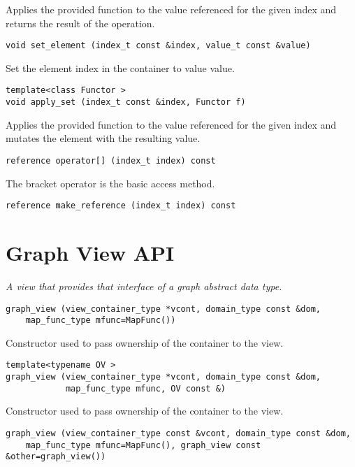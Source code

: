 Applies the provided function to the value referenced for the given index and returns the result of the operation.

\begin{verbatim}
void set_element (index_t const &index, value_t const &value)
\end{verbatim}

Set the element index in the container to value value.

\begin{verbatim}
template<class Functor >
void apply_set (index_t const &index, Functor f)
\end{verbatim}

Applies the provided function to the value referenced for the given index and mutates the element with the resulting value.

\begin{verbatim}
reference operator[] (index_t index) const
\end{verbatim}

The bracket operator is the basic access method.

\begin{verbatim}
reference make_reference (index_t index) const
\end{verbatim}

\pagebreak

\section{Graph View API } \label{sec-graf-vw}

\emph{ A view that provides that interface of a graph abstract data type.}

\begin{verbatim}
graph_view (view_container_type *vcont, domain_type const &dom,
    map_func_type mfunc=MapFunc())
\end{verbatim}

Constructor used to pass ownership of the container to the view.

\begin{verbatim}
template<typename OV >
graph_view (view_container_type *vcont, domain_type const &dom,
            map_func_type mfunc, OV const &)
\end{verbatim}

Constructor used to pass ownership of the container to the view.

\begin{verbatim}
graph_view (view_container_type const &vcont, domain_type const &dom,
    map_func_type mfunc=MapFunc(), graph_view const &other=graph_view())
\end{verbatim}

